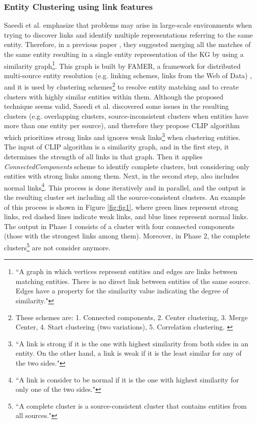 \documentclass[runningheads]{llncs}
\begin{document}
\subsubsection{Entity Clustering using link features} \label{entity-clustering} 
Saeedi et al. \cite{Saeedi} emphasize that problems may arise in large-scale environments when trying to discover links and identify multiple representations referring to the same entity. Therefore, in a previous paper \cite{Peukert}, they suggested merging all the matches of the same entity resulting in a single entity representation of the KG by using a similarity graph\footnote{``A graph in which vertices represent entities and edges are links between matching entities. There is no direct link between entities of the same source. Edges have a property for the similarity value indicating the degree of similarity."\cite{Saeedi}}. This graph is built by FAMER, a framework for distributed multi-source entity resolution (e.g. linking schemes, links from the Web of Data) \cite{Peukert}, and it is used by clustering schemes\footnote{These schemes are: 1. Connected components, 2. Center clustering, 3. Merge Center, 4. Start clustering (two variations), 5. Correlation clustering. \cite{Peukert}} to resolve entity matching and to create clusters with highly similar entities within them. Although the proposed technique seems valid, Saeedi et al. discovered some issues in the resulting clusters (e.g. overlapping clusters, source-inconsistent clusters when entities have more than one entity per source), and therefore they propose CLIP algorithm which prioritizes strong links and ignores weak links\footnote{``A link is strong if it is the one with highest similarity from both sides in an entity. On the other hand, a link is weak if it is the least similar for any of the two sides."\cite{Saeedi}} when clustering entities. The input of CLIP algorithm is a similarity graph, and in the first step, it determines the strength of all links in that graph. Then it applies \textit{ConnectedComponents} scheme to identify complete clusters, but considering only entities with strong links among them. Next, in the second step, also includes normal links\footnote{``A link is consider to be normal if it is the one with highest similarity for only one of the two sides."\cite{Saeedi}}. This process is done iteratively and in parallel, and the output is the resulting cluster set including all the source-consistent clusters. An example of this process is shown in Figure \ref{fig:fig1}, where green lines represent strong links, red dashed lines indicate weak links, and blue lines represent normal links. The output in Phase 1 consists of a cluster with four connected components (those with the strongest links among them). Moreover, in Phase 2, the complete clusters\footnote{``A complete cluster is a source-consistent cluster that contains entities from all sources."\cite{Saeedi}} are not consider anymore.
\end{document}
